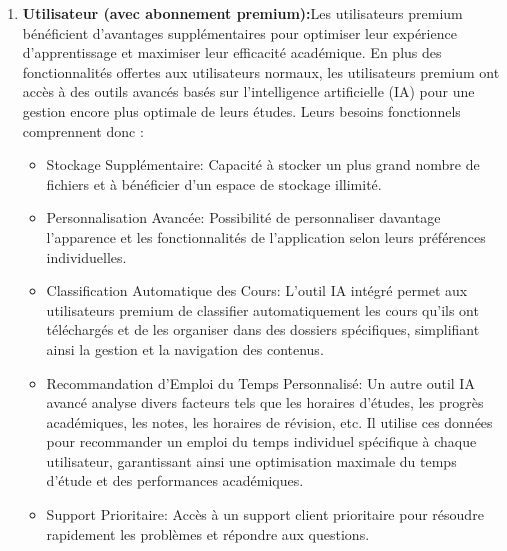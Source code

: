 \begin{enumerate}
\begin{itemize}[label=$\bullet$]
        \end{itemize}
\vspace{5mm}
    \item \textbf{Utilisateur (avec abonnement premium):}Les utilisateurs premium bénéficient d'avantages supplémentaires pour optimiser leur expérience d'apprentissage et maximiser leur efficacité académique. En plus des fonctionnalités offertes aux utilisateurs normaux, les utilisateurs premium ont accès à des outils avancés basés sur l'intelligence artificielle (IA) pour une gestion encore plus optimale de leurs études. Leurs besoins fonctionnels comprennent donc :
    \vspace{4mm}
         \begin{itemize}[label=$\bullet$]
          \item Stockage Supplémentaire: Capacité à stocker un plus grand nombre de fichiers et à bénéficier d'un espace de stockage illimité.
          \vspace{3mm}
          \item Personnalisation Avancée: Possibilité de personnaliser davantage l'apparence et les fonctionnalités de l'application selon leurs préférences individuelles.
          \vspace{3mm}
          \item Classification Automatique des Cours: L'outil IA intégré permet aux utilisateurs premium de classifier automatiquement les cours qu'ils ont téléchargés et de les organiser dans des dossiers spécifiques, simplifiant ainsi la gestion et la navigation des contenus.
          \vspace{3mm}
          \item Recommandation d'Emploi du Temps Personnalisé: Un autre outil IA avancé analyse divers facteurs tels que les horaires d'études, les progrès académiques, les notes, les horaires de révision, etc. Il utilise ces données pour recommander un emploi du temps individuel spécifique à chaque utilisateur, garantissant ainsi une optimisation maximale du temps d'étude et des performances académiques.
          \vspace{3mm}
          \item  Support Prioritaire: Accès à un support client prioritaire pour résoudre rapidement les problèmes et répondre aux questions.
        \end{itemize}
\end{enumerate}












